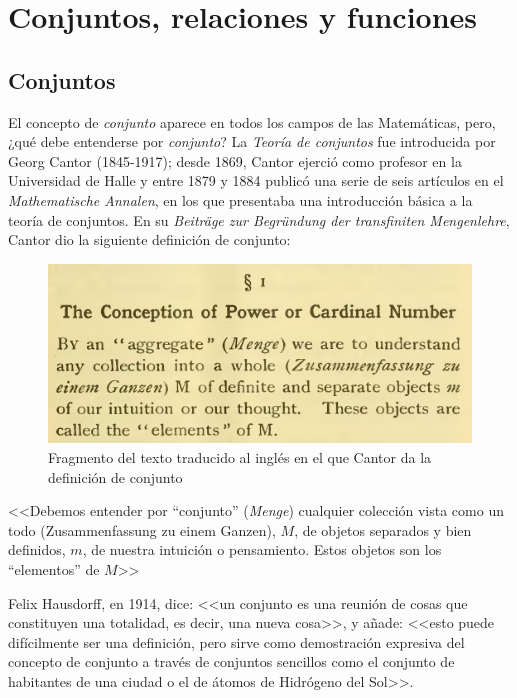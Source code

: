 \chapter{Conjuntos, relaciones y funciones}

\section{Conjuntos}

El concepto de \textit{conjunto} aparece en todos los campos de las Matemáticas,
pero, ¿qué  debe  entenderse  por  \textit{conjunto}? La
\textit{Teoría de conjuntos} fue introducida por Georg Cantor (1845-1917);
desde 1869, Cantor ejerció como profesor en la Universidad de Halle y 
entre 1879 y 1884 publicó una serie de seis artículos en el 
\textit{Mathematische Annalen}, en los que presentaba una introducción
básica a la teoría de conjuntos. En su \textit{Beiträge zur Begründung
der transfiniten Mengenlehre}, Cantor dio la siguiente definición de 
conjunto:

\begin{figure}[h]
  \centering
  \includegraphics[scale=.2]{fig/definicionConjunto}
  \captionsetup{font=footnotesize}
  \caption{Fragmento del texto traducido al inglés en el que Cantor 
           da la definición de conjunto}
\end{figure}

\begin{center}
    <<Debemos entender por ``conjunto'' (\textit{Menge}) cualquier 
    colección vista como un todo (Zusammenfassung zu einem Ganzen), $M$, 
    de objetos separados y bien definidos, $m$, de nuestra intuición 
    o pensamiento. Estos objetos son los ``elementos'' de $M$>> 
\end{center}

Felix Hausdorff, en 1914, dice: <<un conjunto es una reunión de cosas que 
constituyen una totalidad, es decir, una nueva cosa>>, y añade: 
<<esto puede difícilmente ser una definición, pero sirve como demostración 
expresiva del concepto de conjunto a través de conjuntos sencillos como
el conjunto de habitantes de una ciudad o el de átomos de Hidrógeno del 
Sol>>. 

